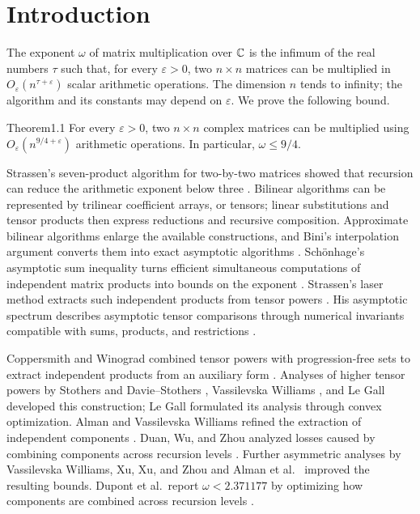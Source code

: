 \section{Introduction}\hypertarget{p107.sec.1}{}
The exponent $\omega$ of matrix multiplication over $\mathbb C$ is the infimum of the real numbers $\tau$ such that, for every $\varepsilon>0$, two $n\times n$ matrices can be multiplied in $O_\varepsilon(n^{\tau+\varepsilon})$ scalar arithmetic operations. The dimension $n$ tends to infinity; the algorithm and its constants may depend on $\varepsilon$. We prove the following bound.
\begin{result}{Theorem}{1.1}{}
For every $\varepsilon>0$, two $n\times n$ complex matrices can be multiplied using $O_\varepsilon(n^{9/4+\varepsilon})$ arithmetic operations. In particular, $\omega\le9/4$.
\end{result}
Strassen's seven-product algorithm for two-by-two matrices showed that recursion can reduce the arithmetic exponent below three \cite{r13}. Bilinear algorithms can be represented by trilinear coefficient arrays, or tensors; linear substitutions and tensor products then express reductions and recursive composition. Approximate bilinear algorithms enlarge the available constructions, and Bini's interpolation argument converts them into exact asymptotic algorithms \cite{r3}. Sch\"onhage's asymptotic sum inequality turns efficient simultaneous computations of independent matrix products into bounds on the exponent \cite{r11}. Strassen's laser method extracts such independent products from tensor powers \cite{r14,r15}. His asymptotic spectrum describes asymptotic tensor comparisons through numerical invariants compatible with sums, products, and restrictions \cite{r16,r4}.

Coppersmith and Winograd combined tensor powers with progression-free sets to extract independent products from an auxiliary form \cite{r5}. Analyses of higher tensor powers by Stothers \cite{r12} and Davie--Stothers \cite{r6}, Vassilevska Williams \cite{r18}, and Le Gall \cite{r10} developed this construction; Le Gall formulated its analysis through convex optimization. Alman and Vassilevska Williams refined the extraction of independent components \cite{r2}. Duan, Wu, and Zhou analyzed losses caused by combining components across recursion levels \cite{r7}. Further asymmetric analyses by Vassilevska Williams, Xu, Xu, and Zhou \cite{r19} and Alman et al.\ \cite{r1} improved the resulting bounds. Dupont et al.\ report $\omega<2.371177$ by optimizing how components are combined across recursion levels \cite{r8}.

